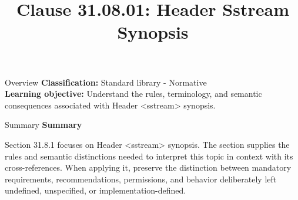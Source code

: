 \documentclass[10pt,letterpaper]{article}
\title{Clause 31.08.01: Header Sstream Synopsis}
\author{}
\date{}
\begin{document}
\maketitle
\begin{CornellOverviewBox}{Overview}
\textbf{Classification:} Standard library - Normative\\[2pt]
\textbf{Learning objective:} Understand the rules, terminology, and semantic consequences associated with Header <sstream> synopsis.
\end{CornellOverviewBox}\begin{CornellSummaryBox}{Summary}
{\sffamily\bfseries\color{Accent} Summary}\par\vspace{3pt}Section 31.8.1 focuses on Header <sstream> synopsis. The section supplies the rules and semantic distinctions needed to interpret this topic in context with its cross-references. When applying it, preserve the distinction between mandatory requirements, recommendations, permissions, and behavior deliberately left undefined, unspecified, or implementation-defined.
\end{CornellSummaryBox}
\end{document}
